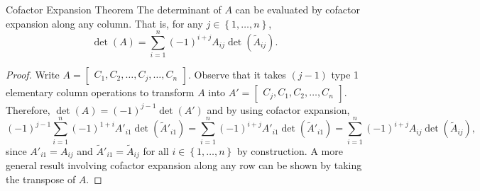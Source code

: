 \documentclass[linearalgebra]{subfiles}
\begin{document}
    \begin{theorem}{Cofactor Expansion Theorem}
        The determinant of $A$ can be evaluated by cofactor expansion along any column. That is, for any $j\in \left\lbrace 1, \ldots, n \right\rbrace$,
        \begin{equation*}
            \det(A) = \sum^n_{i=1} (-1)^{i+j} A_{ij} \det\left( \widetilde{A}_{ij}\right).
        \end{equation*}
    \end{theorem}

    \begin{proof}
        Write $A = \begin{bmatrix} C_1,C_2,\ldots,C_j,\ldots,C_n \end{bmatrix}$. Observe that it takes $(j-1)$ type 1 elementary column operations to transform $A$ into $A' = \begin{bmatrix} C_j, C_1, C_2, \ldots, C_n \end{bmatrix}$. Therefore, $\det(A) = (-1)^{j-1}\det \left( A' \right)$ and by using cofactor expansion,
        \begin{equation*}
            (-1)^{j-1}\sum^n_{i=1} (-1)^{1+i} A'_{i1}\det \left(\widetilde{A}'_{i1}\right) = \sum^n_{i=1} (-1)^{i+j} A'_{i1}\det \left(\widetilde{A}'_{i1}\right) = \sum^n_{i=1} (-1)^{i+j} A_{ij}\det \left(\widetilde{A}_{ij}\right),
        \end{equation*}
        since $A'_{i1} = A_{ij}$ and $\widetilde{A}'_{i1} = \widetilde{A}_{ij}$ for all $i\in \left\lbrace 1, \ldots, n \right\rbrace$ by construction. A more general result involving cofactor expansion along any row can be shown by taking the transpose of $A$.
    \end{proof}
\end{document}
